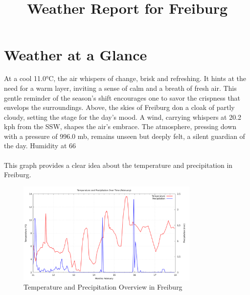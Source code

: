 \documentclass[12pt]{article}
\title{Weather Report for Freiburg}
\date{}
\begin{document}
\maketitle
\section*{Weather at a Glance }
At a cool 11.0°C, the air whispers of change, brisk and refreshing. It hints at the need for a warm layer, inviting a sense of calm and a breath of fresh air. This gentle reminder of the season's shift encourages one to savor the crispness that envelops the surroundings. Above, the skies of Freiburg don a cloak of partly cloudy, setting the stage for the day's mood. A wind, carrying whispers at 20.2 kph from the SSW, shapes the air's embrace. The atmosphere, pressing down with a pressure of 996.0 mb, remains unseen but deeply felt, a silent guardian of the day. Humidity at 66%
\paragraph{}This graph provides a clear idea about the temperature and precipitation in Freiburg.
\begin{figure}[h]
\centering
\includegraphics[width=0.8\textwidth]{data/graph/temperature_precipitation_graph.png}
\caption{Temperature and Precipitation Overview in Freiburg}
\end{figure}
\end{document}
